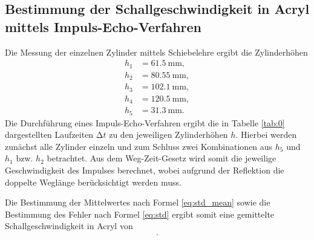 \subsection{Bestimmung der Schallgeschwindigkeit in Acryl mittels Impuls-Echo-Verfahren}
Die Messung der einzelnen Zylinder mittels Schiebelehre ergibt die Zylinderhöhen
\begin{align*}
  h_1 &= \SI{61.5}{\milli\metre}, \\
  h_2 &= \SI{80.55}{\milli\metre}, \\
  h_3 &= \SI{102.1}{\milli\metre}, \\
  h_4 &= \SI{120.5}{\milli\metre}, \\
  h_5 &= \SI{31.3}{\milli\metre}.
\end{align*}
Die Durchführung eines Impuls-Echo-Verfahren ergibt die in Tabelle \ref{tab:0} dargestellten Laufzeiten $\increment t$ zu den jeweiligen Zylinderhöhen $h$.
Hierbei werden zunächst alle Zylinder einzeln und zum Schluss zwei Kombinationen aus $h_5$ und $h_1$ bzw. $h_2$ betrachtet.
Aus dem Weg-Zeit-Gesetz wird somit die jeweilige Geschwindigkeit des Impulses berechnet, wobei aufgrund der Reflektion die doppelte Weglänge berücksichtigt werden muss.
  
Die Bestimmung der Mittelwertes nach Formel \eqref{eq:std_mean} sowie die Bestimmung des Fehler nach Formel \eqref{eq:std} ergibt somit eine gemittelte Schallgeschwindigkeit in Acryl von
\begin{align*}
  .\\
\end{align*}

